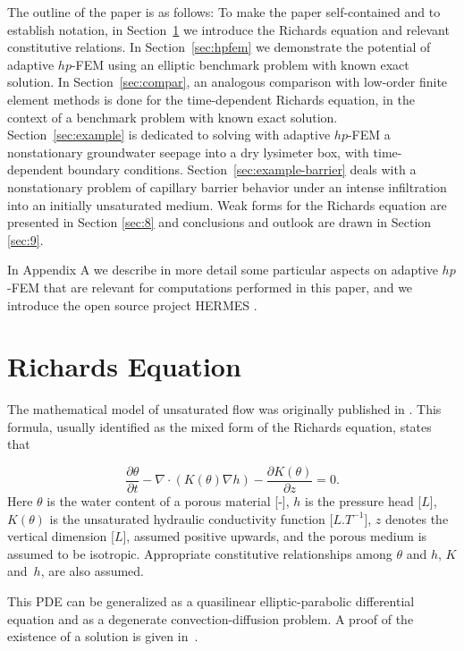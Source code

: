 \documentclass[final,3p,times,twocolumn]{elsarticle}
\begin{document}
The outline of the paper is as follows: To make the paper self-contained and to 
establish notation, in Section~\ref{sec:richards} we introduce the Richards equation and 
relevant constitutive relations. In Section~\ref{sec:hpfem} we
demonstrate the potential of adaptive $hp$-FEM using an elliptic benchmark problem with known 
exact solution. In Section~\ref{sec:compar}, an analogous comparison with low-order finite element 
methods is done for the time-dependent Richards equation, in the context of a 
benchmark problem with known exact solution. Section~\ref{sec:example} is dedicated to solving 
with adaptive $hp$-FEM a nonstationary groundwater seepage into a dry lysimeter box,
with time-dependent boundary conditions. Section~\ref{sec:example-barrier} deals with 
a nonstationary problem of capillary barrier behavior under an intense infiltration into 
an initially unsaturated medium. Weak forms for the Richards equation are presented in 
Section \ref{sec:8} and conclusions and outlook are drawn in Section \ref{sec:9}.

In Appendix A we describe in more detail some particular aspects on adaptive 
$hp$-FEM that are relevant for computations performed in this paper, and we 
introduce the open source project HERMES \cite{hermes}.


\section{Richards Equation}
\label{sec:richards}


The mathematical model of  unsaturated flow was originally published in \cite{richards}. 
This formula, usually identified as the  mixed form of the Richards equation,  states that 

\begin{equation}
\label{mixed}
\frac{\partial \theta}{\partial t} - \nabla \cdot \left( K(\theta) \nabla h \right) - \frac{\partial K(\theta)}{\partial z} = 0.
\end{equation}
Here $\theta$ is the water content of a porous material [-], $h$ is the pressure head [$L$],  $K(\theta)$ is the unsaturated hydraulic conductivity function [$L.T^{-1}$],  $z$ denotes the 
vertical dimension [$L$], assumed positive upwards, and the porous medium is assumed to be isotropic. Appropriate  constitutive
relationships among $\theta$ and $h$, $K$ and~$h$, are also assumed.

This PDE can be generalized as a quasilinear elliptic-parabolic differential equation and as 
a degenerate convection-diffusion problem. A proof of the existence of a   solution  is given in~\cite{alt-luckhaus}. 
\end{document}
